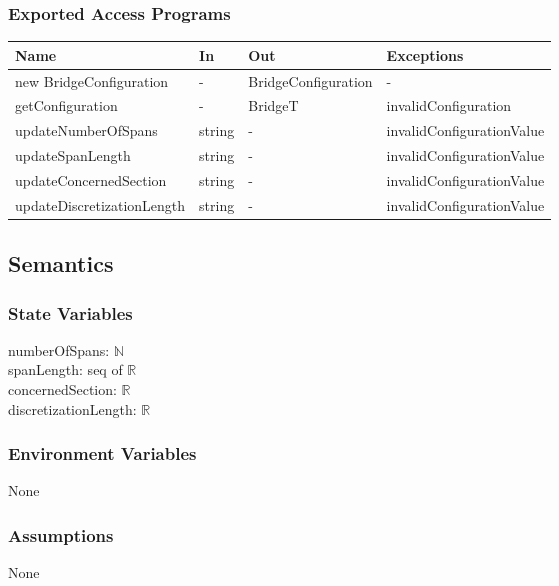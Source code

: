 \documentclass[12pt, titlepage]{article}
\begin{document}
\subsubsection{Exported Access Programs}
\begin{center}
\begin{tabular}{p{5cm} p{2cm} p{4cm} p{4cm}}
\hline
\textbf{Name} & \textbf{In} & \textbf{Out} & \textbf{Exceptions} \\
\hline
new BridgeConfiguration & - & BridgeConfiguration & - \\
\hline
getConfiguration & - & BridgeT & invalidConfiguration \\
\hline
updateNumberOfSpans & string & - & invalidConfigurationValue \\
\hline

\hline
updateSpanLength & string & - & invalidConfigurationValue \\
\hline

\hline
updateConcernedSection & string & - & invalidConfigurationValue \\
\hline

\hline
updateDiscretizationLength & string & - & invalidConfigurationValue \\
\hline

\end{tabular}
\end{center}

\subsection{Semantics}

\subsubsection{State Variables}
numberOfSpans: $\mathbb{N}$\\
spanLength: seq of $\mathbb{R}$ \\
concernedSection: $\mathbb{R}$\\
discretizationLength: $\mathbb{R}$\\

\subsubsection{Environment Variables}
None
\subsubsection{Assumptions}
None
\end{document}
